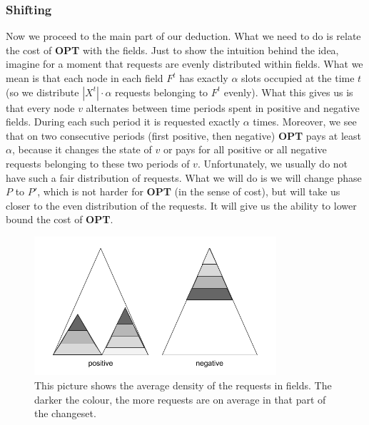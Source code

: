 \subsubsection{Shifting} Now we proceed to the main part of our deduction. What
we need to do is relate the cost of \textbf{OPT} with the fields. Just to
show the intuition behind the idea, imagine for a moment that requests are evenly
distributed within fields. What we mean is that each node in each field $F^t$
has exactly $\alpha$ slots occupied at the time $t$ (so we distribute $|X^t|
\cdot \alpha$ requests belonging to $F^t$ evenly). What this gives us is that
every node $v$ alternates between time periods spent in positive and negative
fields. During each such period it is requested exactly $\alpha$ times. Moreover,
we see that on two consecutive periods (first positive, then negative)
\textbf{OPT} pays at least $\alpha$, because it changes the state of $v$ or pays
for all positive or all negative requests belonging to these two periods of $v$.
Unfortunately, we usually do not have such a fair distribution of requests. What
we will do is we will change phase $P$ to $P'$, which is not harder for
\textbf{OPT} (in the sense of cost), but will take us closer to the even
distribution of the requests. It will give us the ability to lower bound the
cost of \textbf{OPT}.  \begin{figure} \begin{center}
\includegraphics[width=0.8\textwidth]{density_pic.png} \end{center}
\caption{This picture shows the average density of the requests in fields. The
darker the colour, the more requests are on average in that part of the
changeset.} \label{fig:density} \end{figure}

